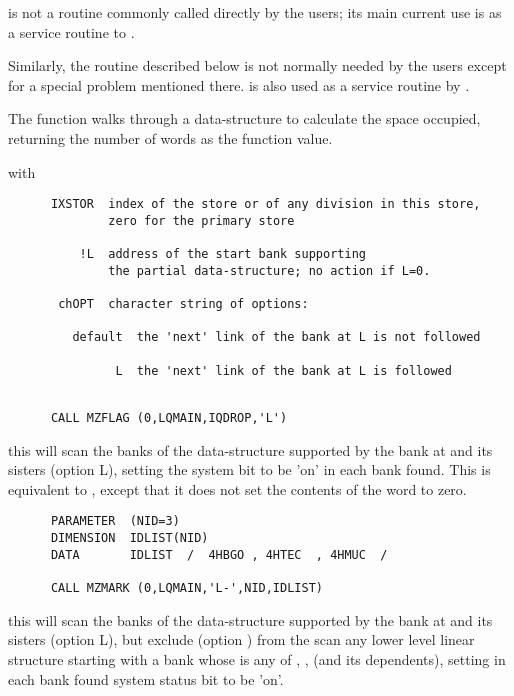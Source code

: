  is not a routine commonly called directly by the users;
its main current use is as a service routine to .

Similarly, the routine  described below
is not normally needed by the users except for a special problem
mentioned there.
 is also used as a service routine by .

The function  walks through a data-structure to calculate
the space occupied, returning the number of words as the function value.


with
\begin{verbatim}
      IXSTOR  index of the store or of any division in this store,
              zero for the primary store

          !L  address of the start bank supporting
              the partial data-structure; no action if L=0.

       chOPT  character string of options:

         default  the 'next' link of the bank at L is not followed

               L  the 'next' link of the bank at L is followed


\end{verbatim} 

\Examples

\begin{verbatim}
      CALL MZFLAG (0,LQMAIN,IQDROP,'L')
\end{verbatim} 
this will scan the banks of the data-structure supported by
the bank at  and its sisters (option L),
setting the system bit  to be 'on' in each bank found.
This is equivalent to ,
except that it does not set the contents of the word  to zero.

\begin{verbatim}
      PARAMETER  (NID=3)
      DIMENSION  IDLIST(NID)
      DATA       IDLIST  /  4HBGO , 4HTEC  , 4HMUC  /

      CALL MZMARK (0,LQMAIN,'L-',NID,IDLIST)
\end{verbatim} 
this will scan the banks of the data-structure supported by
the bank at  and its sisters (option L),
but exclude (option \Ropt{-}) from the scan any lower level linear structure
starting with a bank whose  is any of , 
,  (and its dependents),
setting in each bank found system status bit  to be 'on'.

